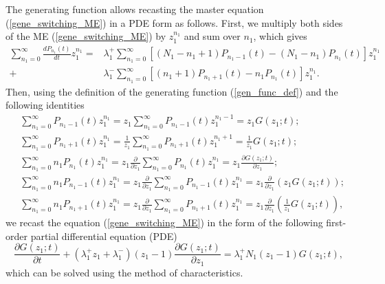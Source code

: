 \documentclass[a4paper, 11pt]{article}
\begin{document}
The generating function allows recasting the master equation (\ref{gene_switching_ME}) in a PDE form as follows. First, we multiply both sides of the ME (\ref{gene_switching_ME}) by $z_1^{n_1}$ and sum over $n_1$, which gives
\begin{equation*}
  \begin{split}
    \sum_{n_1=0}^{\infty}\frac{dP_{n_1}(t)}{dt}z_1^{n_1} = &\lambda_1^+\sum_{n_1=0}^{\infty}\left[(N_1-n_1+1)P_{n_1-1}(t) - (N_1-n_1)P_{n_1}(t)\right]z_1^{n_1}\\
    + & \lambda_1^-\sum_{n_1=0}^{\infty}\left[(n_1+1)P_{n_1+1}(t) - n_1P_{n_1}(t)\right]z_1^{n_1}.
  \end{split}
\end{equation*}
Then, using the definition of the generating function (\ref{gen_func_def}) and the following identities
\begin{align*}
  & \sum_{n_1=0}^{\infty}P_{n_1-1}(t)z_1^{n_1} = z_1\sum_{n_1=0}^{\infty}P_{n_1-1}(t)z_1^{n_1-1} = z_1G(z_1;t);\\
  & \sum_{n_1=0}^{\infty}P_{n_1+1}(t)z_1^{n_1} = \frac{1}{z_1}\sum_{n_1=0}^{\infty}P_{n_1+1}(t)z_1^{n_1+1} = \frac{1}{z_1}G(z_1;t);\\
  & \sum_{n_1=0}^{\infty}n_1P_{n_1}(t)z_1^{n_1} = z_1\frac{\partial}{\partial z_1}\sum_{n_1=0}^{\infty}P_{n_1}(t)z_1^{n_1} = z_1\frac{\partial G(z_1; t)}{\partial z_1};\\
  & \sum_{n_1=0}^{\infty}n_1P_{n_1-1}(t)z_1^{n_1} = z_1\frac{\partial}{\partial z_1}\sum_{n_1=0}^{\infty}P_{n_1-1}(t)z_1^{n_1} = z_1\frac{\partial}{\partial z_1} \left(z_1G(z_1; t)\right);\\
  & \sum_{n_1=0}^{\infty}n_1P_{n_1+1}(t)z_1^{n_1} = z_1\frac{\partial}{\partial z_1}\sum_{n_1=0}^{\infty}P_{n_1+1}(t)z_1^{n_1} = z_1\frac{\partial}{\partial z_1} \left(\frac{1}{z_1}G(z_1; t)\right),
\end{align*}
we recast the equation (\ref{gene_switching_ME}) in the form of the following first-order partial differential equation (PDE)
\begin{equation*} \label{gene_switching_PDE}
  \frac{\partial G(z_1;t)}{\partial t} + (\lambda_1^+z_1 + \lambda_1^-)(z_1-1)\frac{\partial G(z_1;t)}{\partial z_1} = \lambda_1^+N_1(z_1-1)G(z_1;t),
\end{equation*}
which can be solved using the method of characteristics.
\end{document}
